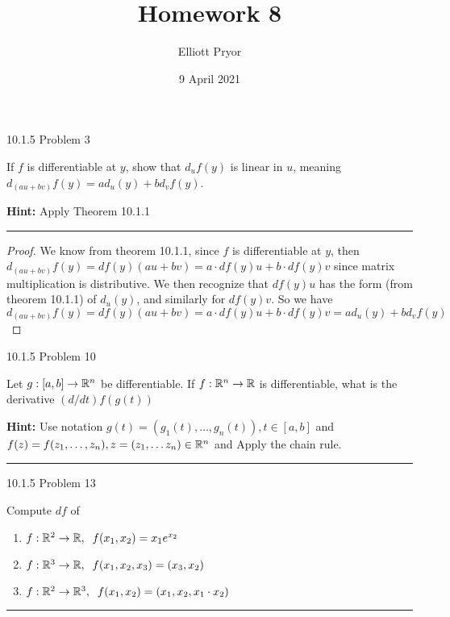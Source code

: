 \documentclass[11pt]{article}
\title{Homework 8}
\author{Elliott Pryor}
\date{9 April 2021}
\begin{document}
\maketitle

 10.1.5 Problem 3

If $f$ is differentiable at $y$, show that $d_uf(y)$ is linear in $u$,
meaning $d_{(au + bv)}f(y) = a d_u(y) + b d_v f(y)$.

\textbf{Hint:} Apply Theorem 10.1.1

\hrule


\begin{proof}
    
    We know from theorem 10.1.1, since $f$ is differentiable at $y$, then
    $d_{(au + bv)}f(y) = df(y) (au + bv) = a \cdot df(y) u + b \cdot df(y)  v$
    since matrix multiplication is distributive. 
    We then recognize that $df(y) u$ has the form (from theorem 10.1.1) of $d_u(y)$,
    and similarly for $df(y) v$. So we have 
    $d_{(au + bv)}f(y) = df(y) (au + bv) = a \cdot df(y) u + b \cdot df(y)  v = a d_u(y) + b d_v f(y)$
\end{proof}





 10.1.5 Problem 10

Let $g : [a,b] \to \mathbb{R}^n$ be differentiable. If $f : \mathbb{R}^n \to \mathbb{R}$ is differentiable,
what is the derivative $(d/dt)f(g(t))$

\textbf{Hint:} Use notation $g(t) = (g_1(t), \dots, g_n(t)), t \in [a,b]$
and $f(z) = f(z_1, \dots, z_n), z = (z_1, \dots z_n) \in \mathbb{R}^n$ and Apply
the chain rule.

\hrule









 10.1.5 Problem 13

Compute $df$ of 
\begin{enumerate}
    \item $f: \mathbb{R}^2 \to \mathbb{R}, \; \; f(x_1, x_2) = x_1 e^{x_2}$
    \item $f: \mathbb{R}^3 \to \mathbb{R}, \; \; f(x_1, x_2, x_3) = (x_3, x_2)$
    \item $f: \mathbb{R}^2 \to \mathbb{R}^3, \; \; f(x_1, x_2) = (x_1, x_2, x_1\cdot x_2)$
\end{enumerate}

\hrule
\end{document}
